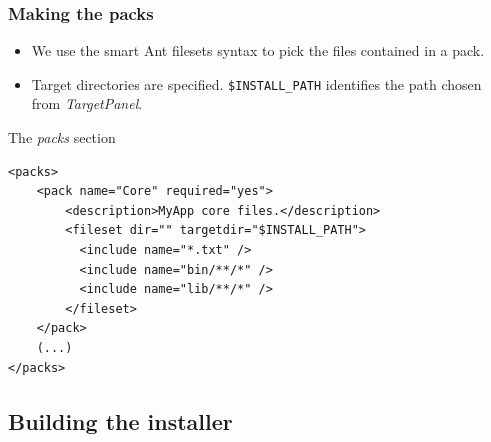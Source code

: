 \documentclass[compress,10pt]{beamer}
\begin{document}

\begin{frame}[containsverbatim]

\frametitle{Making the packs}

\begin{itemize}

  \item We use the smart Ant filesets syntax to pick the files contained in a
  pack.

  \item Target directories are specified. \alert{\texttt{\small\$INSTALL\_PATH}
  identifies the path chosen from \textsl{TargetPanel}}.

\end{itemize}

\begin{block}{The \textsl{packs} section}
\tiny
\begin{verbatim}
<packs>
    <pack name="Core" required="yes">
        <description>MyApp core files.</description>
        <fileset dir="" targetdir="$INSTALL_PATH">
          <include name="*.txt" />
          <include name="bin/**/*" />
          <include name="lib/**/*" />
        </fileset>
    </pack>
    (...)
</packs>
\end{verbatim}
\end{block}

\end{frame}


\subsection{Building the installer}
\end{document}
